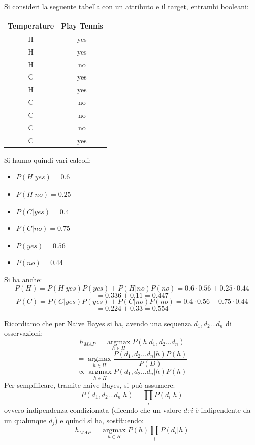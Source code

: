 \begin{esercizio}
  Si consideri la seguente tabella con un attributo e il target, entrambi
  booleani:
  \begin{table}[H]
    \centering
    \begin{tabular}{c||c}
      Temperature & Play Tennis\\
      \hline
      \hline
      H & yes\\
      H & yes\\
      H & no\\
      C & yes\\
      H & yes\\
      C & no\\
      C & no\\
      C & no\\
      C & yes\\
    \end{tabular}
  \end{table}
  Si hanno quindi vari calcoli:
  \begin{itemize}
    \item $P(H|yes)=0.6$
    \item $P(H|no)=0.25$
    \item $P(C|yes)=0.4$
    \item $P(C|no)=0.75$
    \item $P(yes)=0.56$
    \item $P(no)=0.44$
  \end{itemize}
  Si ha anche:
  \[P(H)=P(H|yes)P(yes)+P(H|no)P(no)=0.6\cdot 0.56+0.25\cdot 0.44 \]
  \[= 0.336+0.11=0.447\]
  \[P(C)=P(C|yes)P(yes)+P(C|no)P(no)=0.4\cdot 0.56+0.75\cdot 0.44 \]
  \[= 0.224+0.33=0.554\]
\end{esercizio}
Ricordiamo che per Naive Bayes si ha, avendo una sequenza $d_1, d_2\ldots d_n$ di
osservazioni: 
\[h_{MAP}=\operatorname*{argmax}_{h\in H}P(h|d_1, d_2\ldots d_n)\]
\[=\operatorname*{argmax}_{h\in H}\frac{P(d_1, d_2\ldots d_n|h)P(h)}{P(D)}\]
\[\varpropto\operatorname*{argmax}_{h\in H}P(d_1, d_2\ldots d_n|h)P(h)\]
Per semplificare, tramite naive Bayes, si può assumere:
\[P(d_1, d_2\ldots d_n|h)=\prod_iP(d_i|h)\]
ovvero indipendenza condizionata (dicendo che un valore $d:i$ è indipendente da
un qualunque $d_j$) e quindi si ha, sostituendo:
\[h_{MAP}=\operatorname*{argmax}_{h\in H}P(h)\prod_iP(d_i|h)\]
\newpage
